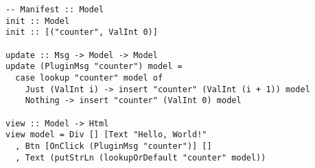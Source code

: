 \begin{verbatim}
-- Manifest :: Model
init :: Model
init :: [("counter", ValInt 0)]

update :: Msg -> Model -> Model
update (PluginMsg "counter") model =
  case lookup "counter" model of
    Just (ValInt i) -> insert "counter" (ValInt (i + 1)) model
    Nothing -> insert "counter" (ValInt 0) model

view :: Model -> Html
view model = Div [] [Text "Hello, World!"
  , Btn [OnClick (PluginMsg "counter")] []
  , Text (putStrLn (lookupOrDefault "counter" model))
\end{verbatim}


